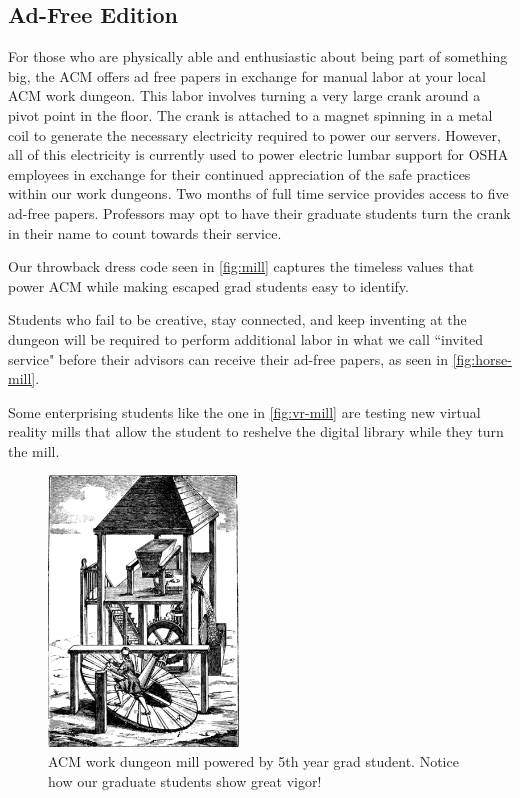 \subsection{Ad-Free Edition}
For those who are physically able and enthusiastic about being part of
something big, the ACM offers ad free papers in exchange for manual labor at
your local ACM work dungeon.
This labor involves turning a very large crank around a pivot point in the
floor.
The crank is attached to a magnet spinning in a metal coil to generate the
necessary electricity required to power our servers.
However, all of this electricity is currently used to power electric lumbar
support for OSHA employees in exchange for their continued appreciation of the
safe practices within our work dungeons.
Two months of full time service provides access to five ad-free papers.
Professors may opt to have their graduate students turn the crank in their name
to count towards their service.

Our throwback dress code seen in \autoref{fig:mill} captures the timeless
values that power ACM while making escaped grad students easy to identify.

Students who fail to be creative, stay connected, and keep inventing at the
dungeon will be required to perform additional labor in what we call ``invited
service" before their advisors can receive their ad-free papers, as seen in
\autoref{fig:horse-mill}.

Some enterprising students like the one in \autoref{fig:vr-mill} are testing
new virtual reality mills that allow the student to reshelve the digital
library while they turn the mill.

\begin{figure}
  \centering
  \includegraphics[width=0.45\textwidth]{figures/mill.png}
  \caption{ACM work dungeon mill powered by 5th year grad student. Notice how
  our graduate students show great vigor!}
  \label{fig:mill}
\end{figure}

